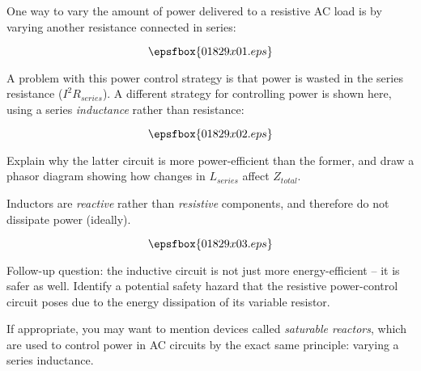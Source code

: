

One way to vary the amount of power delivered to a resistive AC load is by varying another resistance connected in series:

$$\epsfbox{01829x01.eps}$$

A problem with this power control strategy is that power is wasted in the series resistance ($I^2R_{series}$).  A different strategy for controlling power is shown here, using a series {\it inductance} rather than resistance:

$$\epsfbox{01829x02.eps}$$

Explain why the latter circuit is more power-efficient than the former, and draw a phasor diagram showing how changes in $L_{series}$ affect $Z_{total}$.







Inductors are {\it reactive} rather than {\it resistive} components, and therefore do not dissipate power (ideally).

$$\epsfbox{01829x03.eps}$$

\vskip 10pt

Follow-up question: the inductive circuit is not just more energy-efficient -- it is safer as well.  Identify a potential safety hazard that the resistive power-control circuit poses due to the energy dissipation of its variable resistor.







If appropriate, you may want to mention devices called {\it saturable reactors}, which are used to control power in AC circuits by the exact same principle: varying a series inductance.




